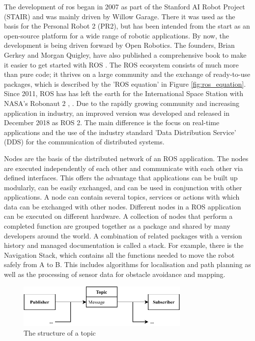The development of \gls{ros} began in 2007 as part of the Stanford AI Robot Project (STAIR) and was mainly driven by Willow Garage. There it was used as the basis for the Personal Robot 2 (PR2), but has been intended from the start as an open-source platform for a wide range of robotic applications. By now, the development is being driven forward by Open Robotics. The founders, Brian Gerkey and Morgan Quigley, have also published a comprehensive book to make it easier to get started with ROS \cite{Quigleyetal}. The ROS ecosystem consists of much more than pure code; it thrives on a large community and the exchange of ready-to-use packages, which is described by the 'ROS equation' in Figure \ref{fig:ros_equation}. Since 2011, ROS has has left the earth for the International Space Station with NASA's Robonaut 2 \cite{Diftleretal.2011}, \cite{Badgeretal.2016}. Due to the rapidly growing community and increasing application in industry, an improved version was developed and released in December 2018 as ROS 2. The main difference is the focus on real-time applications and the use of the industry standard 'Data Distribution Service' (DDS) for the communication of distributed systems.

Nodes are the basis of the distributed network of an ROS application. The nodes are executed independently of each other and communicate with each other via defined interfaces. This offers the advantage that applications can be built up modularly, can be easily exchanged, and can be used in conjunction with other applications. A node can contain several topics, services or actions with which data can be exchanged with other nodes. Different nodes in a ROS application can be executed on different hardware. A collection of nodes that perform a completed function are grouped together as a package and shared by many developers around the world. A combination of related packages with a version history and managed documentation is called a stack. For example, there is the Navigation Stack, which contains all the functions needed to move the robot safely from A to B. This includes algorithms for localisation and path planning as well as the processing of sensor data for obstacle avoidance and mapping.

\begin{figure}[h]
    \centering
    \includegraphics[width=0.75\textwidth]{figures/02_state_of_the_art/topics.pdf}
    \caption{The structure of a topic}
    \label{fig:topics}
\end{figure}


